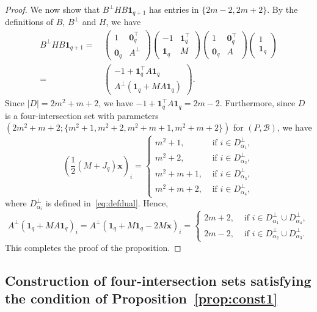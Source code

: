 \documentclass[10pt]{amsart}
\theoremstyle{definition}
\newcommand*\tra{\top}
\newcommand*{\un}{\mathbf{1}}
\newcommand*{\bfx}{\mathbf{x}}
\newcommand*{\bfo}{\mathbf{0}}
\begin{document}
\begin{proof}
We now show that $B^\perp H B\un_{q+1}$ has entries in $\{2m-2,2m+2\}$. By the definitions of $B$, $B^\perp$ and $H$, we have
\begin{align*}
B^\perp H B\un_{q+1}=&\,
\begin{pmatrix} 1 & \bfo_q^\tra \\ \bfo_q & A^\perp
\end{pmatrix}
\begin{pmatrix} -1 & \un_q^\tra \\ \un_q & M
\end{pmatrix}
\begin{pmatrix} 1 & \bfo_q^\tra \\ \bfo_q & A
\end{pmatrix}
\begin{pmatrix} 1 \\ \un_q
\end{pmatrix}\\
=&\,
\begin{pmatrix} -1 + \un_q^\tra A \un_q \\
A^\perp (\un_q+MA\un_q)
\end{pmatrix}.
\end{align*}
Since $|D|=2m^2+m+2$, we have $-1 + \un_q^\tra A \un_q=2m-2$. Furthermore, since $D$ is a four-intersection set with parameters $(2m^2+m+2;\{m^2+1,m^2+2,m^2+m+1,m^2+m+2\})$ for $(P,{\mathcal B})$, we have
\[
\left(\frac{1}{2}(M+J_q)\bfx\right)_i=
\begin{cases}
m^2+1,& \text{ if } i\in D_{\alpha_1}^\perp,\\
m^2+2,& \text{ if } i\in D_{\alpha_2}^\perp,\\
m^2+m+1,& \text{ if } i\in D_{\alpha_3}^\perp, \\
m^2+m+2,& \text{ if } i\in D_{\alpha_4}^\perp,
\end{cases}
\]
where $D_{\alpha_i}^\perp$ is defined in~\eqref{eq:defdual}. Hence,
\[
A^\perp \left(\un_q+MA\un_q\right)_i= A^\perp \left(\un_q+M\un_q-2M\bfx\right)_i=
\begin{cases}
2m+2,& \text{ if } i\in D_{\alpha_1}^\perp \cup D_{\alpha_4}^\perp,\\
2m-2,& \text{ if } i\in D_{\alpha_2}^\perp \cup D_{\alpha_3}^\perp.
\end{cases}
\]
This completes the proof of the proposition.
\end{proof}

\subsection{Construction of four-intersection sets satisfying the condition of Proposition~\ref{prop:const1}}\label{sec:4.2}
\end{document}
